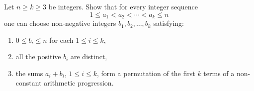 \begin{problem}
    Let \( n \ge k \ge 3 \) be integers. Show that for every integer sequence
    \[
        1 \le a_1 < a_2 < \cdots < a_k \le n
    \]
    one can choose non-negative integers \( b_1,b_2,\dots,b_k \) satisfying:

    \begin{enumerate}
        \item \( 0 \le b_i \le n \) for each \( 1 \le i \le k \),
        \item all the positive \( b_i \) are distinct,
        \item the sums \( a_i + b_i \), \( 1 \le i \le k \), form a permutation of the first \( k \) terms of a non-constant arithmetic progression.
    \end{enumerate}
\end{problem}
